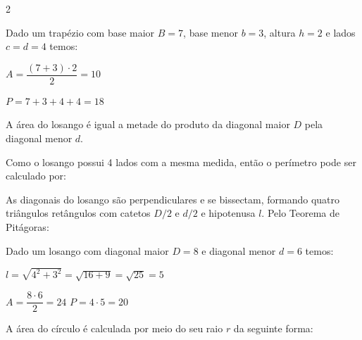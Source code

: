 \documentclass[12pt]{article}
\begin{document}
\begin{multicols}{2}


Dado um trapézio com base maior $B=7$, base menor $b=3$, altura $h=2$ e lados $c=d=4$ temos:

\vspace{8pt}
$A = \dfrac{(7 + 3) \cdot 2}{2} = 10$
\vspace{8pt}

$P=7+3+4+4=18$


A área do losango é igual a metade do produto da diagonal maior $D$ pela diagonal menor $d$. 


\vspace{-0.4cm}
\begin{center}
\end{center}

Como o losango possui 4 lados com a mesma medida, então o perímetro pode ser calculado por:


As diagonais do losango são perpendiculares e se bissectam, formando quatro triângulos retângulos com catetos $D/2$ e $d/2$ e hipotenusa $l$. Pelo Teorema de Pitágoras:



Dado um losango com diagonal maior $D=8$ e diagonal menor $d=6$ temos:

$l = \sqrt{4^2 + 3^2} = \sqrt{16+9} = \sqrt{25} = 5$

$A = \dfrac{8 \cdot 6}{2} = 24$ \qquad $P = 4 \cdot 5 = 20$


A área do círculo é calculada por meio do seu raio $r$ da seguinte forma: 


\end{multicols}
\end{document}
